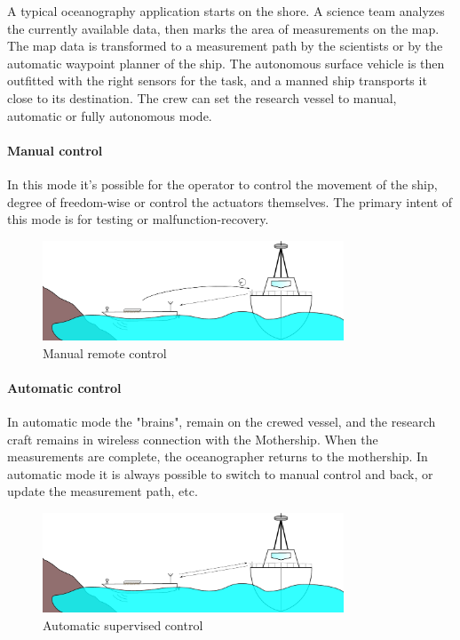  A typical oceanography application starts on the shore. A science team analyzes the currently available data, then marks the area of measurements on the map. The  map data is transformed to a measurement path by the scientists or by the automatic waypoint planner of the ship. The autonomous surface vehicle is then outfitted with the right sensors for the task, and a manned ship transports it close to its destination. The crew can set the research vessel to manual, automatic or fully autonomous mode.

\paragraph{Manual control}
In this mode it's possible for the operator to control the movement of the ship, degree of freedom-wise or control the actuators themselves. The primary intent of this mode is for testing or malfunction-recovery.

\begin{figure}[H]
	\centering
	\includegraphics[width=0.8\textwidth]{img/manualcontrol}
	\caption{Manual remote control}
	\label{fig:manualcontrol}
\end{figure}

\paragraph{Automatic control}
In automatic mode the "brains", remain on the crewed vessel, and the research craft remains in wireless connection with the Mothership. When the measurements are complete, the oceanographer returns to the mothership. In automatic mode it is always possible to switch to manual control and back, or update the measurement path, etc.

\begin{figure}[H]
	\centering
	\includegraphics[width=0.8\textwidth]{img/automatic}
	\caption{Automatic supervised control}
	\label{fig:automatic}
\end{figure}

